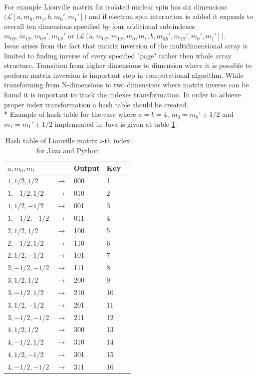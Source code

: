 \\
For example Liouville matrix for isolated nuclear spin has six dimensions $\Big(\mathcal{L}[a,m_0,m_1,b,m_0',m_1']\Big)$ and if electron spin interaction is added it expands to overall ten dimensions specified by four additional sub-indexes $m_{0S},m_{1S},m_{0S}',m_{1S}'$ or $\Big(\mathcal{L}[a,m_{0S},m_{1S},m_0,m_1,b,m_{0S}',m_{1S}',m_0',m_1']\Big)$. \\
Issue arises from the fact that matrix inversion of the multidimensional array is limited to finding inverse of every specified "page" rather then whole array structure. Transition from higher dimensions to dimension where it is possible to perform matrix inversion is important step in computational algorithm. While transforming from N-dimensions to two dimensions where matrix inverse can be found it is important to track the indexes transformation. In order to achieve proper index transformation a hash table should be created. \\*
 Example of hash table for the case where $a=b=4$, $m_0=m_0'\pm1/2$ and $m_1=m_1'\pm1/2$ implemented in Java is given at table \ref{table:kysymys}. 

\begin{table}[h!]
\begin{center}
    \begin{tabular}{  l  l  l  l l }
    \hline
    $a,m_0,m_1$ &  & Output & Key\\ \hline
    $1,1/2,1/2$ & $\rightarrow$ & 000 & 1 \\ \hline
    $1,-1/2,1/2$ & $\rightarrow$ & 010 & 2  \\ \hline
    $1,1/2,-1/2$ & $\rightarrow$ & 001 & 3 \\ \hline
    $1,-1/2,-1/2$ & $\rightarrow$ & 011  & 4\\ \hline
    $2,1/2,1/2$ & $\rightarrow$ & 100 & 5 \\ \hline
    $2,-1/2,1/2$ & $\rightarrow$ & 110 & 6  \\ \hline
    $2,1/2,-1/2$ & $\rightarrow$ & 101 & 7 \\ \hline
    $2,-1/2,-1/2$ & $\rightarrow$ & 111  & 8\\ \hline
    $3,1/2,1/2$ & $\rightarrow$ & 200 & 9 \\ \hline
    $3,-1/2,1/2$ & $\rightarrow$ & 210 & 10  \\ \hline
    $3,1/2,-1/2$ & $\rightarrow$ & 201 & 11 \\ \hline
    $3,-1/2,-1/2$ & $\rightarrow$ & 211  & 12\\ \hline
    $4,1/2,1/2$ & $\rightarrow$ & 300 & 13 \\ \hline
    $4,-1/2,1/2$ & $\rightarrow$ & 310 & 14  \\ \hline
    $4,1/2,-1/2$ & $\rightarrow$ & 301 & 15 \\ \hline
    $4,-1/2,-1/2$ & $\rightarrow$ & 311  & 16\\ \hline

    \end{tabular}
\end{center}
\caption{Hash table of Liouville matrix $i$-th index for Java and Python}
\label{table:kysymys}
\end{table}

